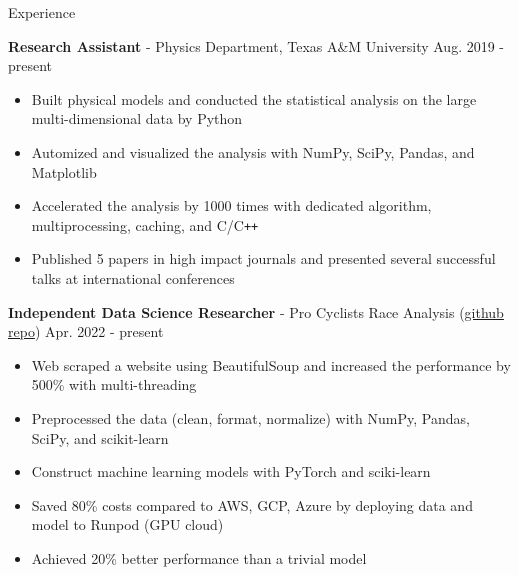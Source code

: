 \documentclass{resume}
\begin{document}
\vspace{-0.5em}
\begin{rSection}{Experience}
    \vspace{-1em}
    \item \textbf{Research Assistant} - Physics Department, Texas A\&M University \hfill Aug. 2019 - present
        \begin{itemize}
        \item Built physical models and conducted the statistical analysis on the large multi-dimensional data by Python
        \item Automized and visualized the analysis with NumPy, SciPy, Pandas, and Matplotlib
        \item Accelerated the analysis by 1000 times with dedicated algorithm, multiprocessing, caching, and C/C\texttt{++}
        \item Published 5 papers in high impact journals and presented several successful talks at international conferences
        \end{itemize}

    \item \textbf{Independent Data Science Researcher} - {Pro Cyclists Race Analysis} (\href{https://github.com/noctildon/pro_cyclists}{github repo}) \hfill Apr. 2022 - present
        \begin{itemize}
        \item Web scraped a website using BeautifulSoup and increased the performance by 500\% with multi-threading
        \item Preprocessed the data (clean, format, normalize) with NumPy, Pandas, SciPy, and scikit-learn
        \item Construct machine learning models with PyTorch and sciki-learn
        \item Saved 80\% costs compared to AWS, GCP, Azure by deploying data and model to Runpod (GPU cloud)
        \item Achieved 20\% better performance than a trivial model
        \end{itemize}


\end{rSection}
\end{document}
